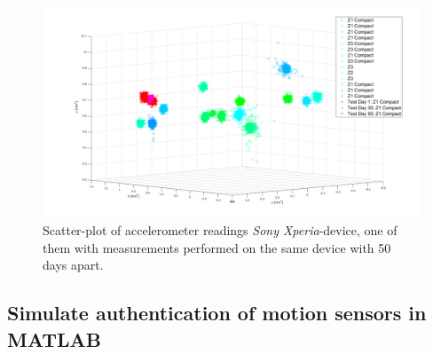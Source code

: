 \begin{figure}[H]
	\centering
	\includegraphics[scale=.3]{img/senrec-sony_scatter-2}
	\caption{Scatter-plot of accelerometer readings \textit{Sony Xperia}-device, one of them with measurements performed on the same device with 50 days apart.}
	\label{fig:scatterSony50days}
\end{figure}

\subsection{Simulate authentication of motion sensors in MATLAB}


